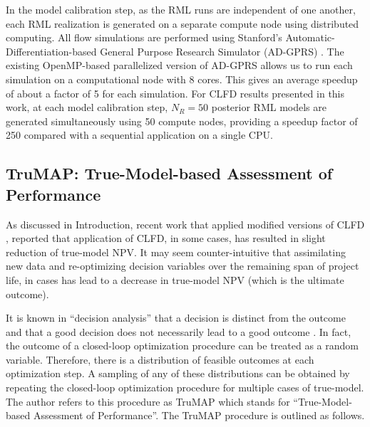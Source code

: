 \documentclass[11pt]{article}
\begin{document}
In the model calibration step, as the RML runs are independent of one another,
each RML realization is generated on a separate compute node using distributed computing.
All flow simulations are performed using Stanford's Automatic-Differentiation-based General Purpose Research Simulator (AD-GPRS) \citep{younis:11}.
The existing OpenMP-based parallelized version of AD-GPRS \citep{zhou:12m}
allows us to run each simulation on a computational node with 8 cores.
This gives an average speedup of about a factor of 5 for each simulation.
For CLFD results presented in this work,
at each model calibration step, $N_R = 50$ posterior RML models are generated simultaneously using 50 compute nodes, providing a speedup factor
of 250 compared with a sequential application on a single CPU.



\subsection{TruMAP: True-Model-based Assessment of Performance}
As discussed in Introduction, recent work that applied modified versions of CLFD \citep{morosov:16,hanea:17},
reported that application of CLFD, in some cases, has resulted in slight reduction of true-model NPV.
It may seem counter-intuitive that assimilating new data and re-optimizing decision variables over the remaining span of project life,
in cases has lead to a decrease in true-model NPV (which is the ultimate outcome).

It is known in ``decision analysis'' that a decision is distinct from the outcome
 and that a good decision does not necessarily lead to a good outcome \citep{howard:88,bratvold:08}.
In fact, the outcome of a closed-loop optimization procedure can be treated as a random variable.
Therefore, there is a distribution of feasible outcomes at each optimization step.
A sampling of any of these distributions can be obtained by repeating the closed-loop optimization procedure for multiple cases of true-model.
The author refers to this procedure as TruMAP which stands for
``True-Model-based Assessment of Performance''.
The TruMAP procedure is outlined as follows.
\end{document}
